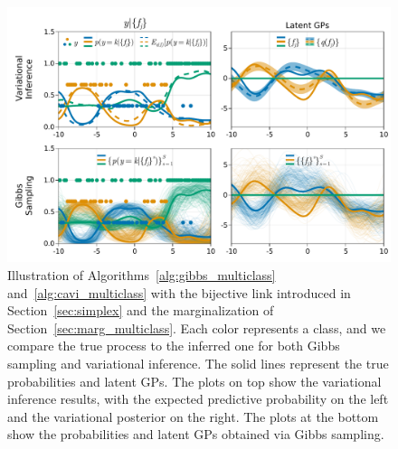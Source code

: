 \begin{figure}[H]
    \centering
    \includegraphics[width=\textwidth]{./chapters/8_discussions/figures/categorical_bijective.pdf}
    \caption{Illustration of Algorithms~\ref{alg:gibbs_multiclass} and~\ref{alg:cavi_multiclass} with the bijective link introduced in Section~\ref{sec:simplex} and the marginalization of Section~\ref{sec:marg_multiclass}.
    Each color represents a class, and we compare the true process to the inferred one for both Gibbs sampling and variational inference.
    The solid lines represent the true probabilities and latent \acp{GP}.
    The plots on top show the variational inference results, with the expected predictive probability on the left and the variational posterior on the right.
    The plots at the bottom show the probabilities and latent \acp{GP} obtained via Gibbs sampling.}
    \label{fig:bijective_multiclass}
\end{figure}

